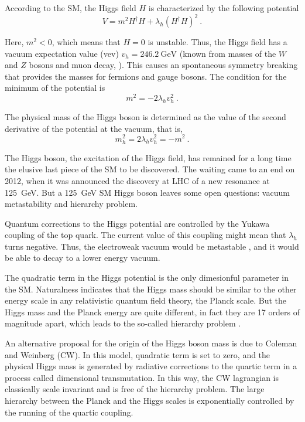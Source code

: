 \documentclass[aps,prd,preprintnumbers,nofootinbibn,twocolumn]{revtex4}
\begin{document}
According to the SM, the Higgs field $H$ is characterized by the following potential
\begin{equation}\label{eq:HiggsPotential}
V = m^2 H^\dagger H + \lambda_h (H^\dagger H)^2\ .
\end{equation}

Here, $m^2 < 0$, which means that $H=0$ is unstable. Thus, the Higgs field has a vacuum expectation value (vev) $v_h=\SI{246.2}{\giga\electronvolt}$ (known from masses of the $W$ and $Z$ bosons and muon decay, \cite{Agashe:2014kda}). This causes an spontaneous symmetry breaking that provides the masses for fermions and gauge bosons. The condition for the minimum of the potential is 
\begin{equation}
m^2 = -2\lambda_h v_h^2\ .
\end{equation}

The physical mass of the Higgs boson is determined as the value of the second derivative of the potential at the vacuum, that is, 
\begin{equation}
m_h^2 = 2 \lambda_h v_h^2=-m^2\ .
\end{equation}

The Higgs boson, the excitation of the Higgs field, has remained for a long time the elusive last piece of the SM to be discovered. The waiting came to an end on 2012, when it was announced the discovery at LHC \cite{Aad:2012tfa,Chatrchyan:2012xdj} of a new resonance at \SI{125}{\giga\electronvolt}. But a \SI{125}{\giga\electronvolt} SM Higgs boson leaves some open questions: vacuum metastability and hierarchy problem.
 
Quantum corrections to the Higgs potential are controlled by the Yukawa coupling of the top quark. The current value of this coupling might mean that $\lambda_h$ turns negative. Thus, the electroweak vacuum would be metastable \cite{EliasMiro:2011aa}, and it would be able to decay to a lower energy vacuum.

The quadratic term in the Higgs potential is the only dimesionful parameter in the SM. Naturalness indicates that the Higgs mass should be similar to the other energy scale in any relativistic quantum field theory, the Planck scale. But the Higgs mass and the Planck energy are quite different, in fact they are 17 orders of magnitude apart, which leads to the so-called hierarchy problem \cite{Iso:2013aqa}. 

An alternative proposal for the origin of the Higgs boson mass is due to Coleman and Weinberg \cite{Coleman:1973jx} (CW). In this model, quadratic term is set to zero, and the physical Higgs mass is generated by radiative corrections to the quartic term in a process called dimensional transmutation. In this way, the CW lagrangian is classically scale invariant and is free of the hierarchy problem. The large hierarchy between the Planck and the Higgs scales is exponentially controlled by the running of the quartic coupling. 
\end{document}
